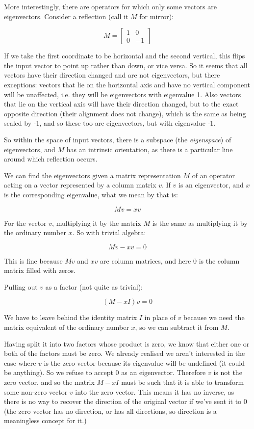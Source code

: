 More interestingly, there are operators for which only some vectors are eigenvectors. Consider a reflection (call it $M$ for mirror):

$$M = \begin{bmatrix}1 & 0 \\ 0 & -1\end{bmatrix}$$

If we take the first coordinate to be horizontal and the second vertical, this flips the input vector to point up rather than down, or vice versa. So it seems that all vectors have their direction changed and are not eigenvectors, but there exceptions: vectors that lie on the horizontal axis and have no vertical component will be unaffected, i.e. they will be eigenvectors with eigenvalue 1. Also vectors that lie on the vertical axis will have their direction changed, but to the exact opposite direction (their alignment does not change), which is the same as being scaled by -1, and so these too are eigenvectors, but with eigenvalue -1.

So within the space of input vectors, there is a subspace (the \textit{eigenspace}) of eigenvectors, and $M$ has an intrinsic orientation, as there is a particular line around which reflection occurs.

We can find the eigenvectors given a matrix representation $M$ of an operator acting on a vector represented by a column matrix $v$. If $v$ is an eigenvector, and $x$ is the corresponding eigenvalue, what we mean by that is:

$$Mv = xv$$

For the vector $v$, multiplying it by the matrix $M$ is the same as multiplying it by the ordinary number $x$. So with trivial algebra:

$$Mv - xv = 0$$

This is fine because $Mv$ and $xv$ are column matrices, and here $0$ is the column matrix filled with zeros.

Pulling out $v$ as a factor (not quite as trivial):

$$(M - xI)v = 0$$

We have to leave behind the identity matrix $I$ in place of $v$ because we need the matrix equivalent of the ordinary number $x$, so we can subtract it from $M$.

Having split it into two factors whose product is zero, we know that either one or both of the factors must be zero. We already realised we aren't interested in the case where $v$ is the zero vector because its eigenvalue will be undefined (it could be anything). So we refuse to accept $0$ as an eigenvector. Therefore $v$ is not the zero vector, and so the matrix $M - xI$ must be such that it is able to transform some non-zero vector $v$ into the zero vector. This means it has no inverse, as there is no way to recover the direction of the original vector if we've sent it to $0$ (the zero vector has no direction, or has all directions, so direction is a meaningless concept for it.)

